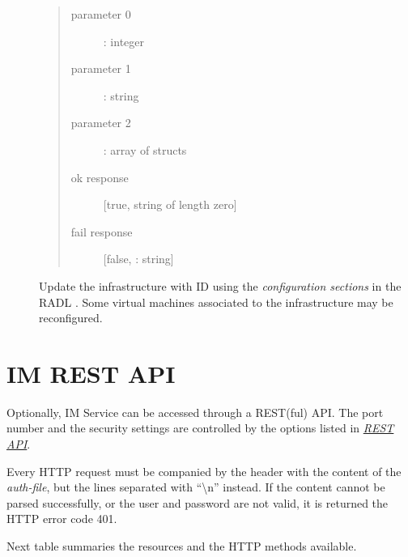 \documentclass[letterpaper,10pt,english]{sphinxmanual}
\begin{document}
\label{xmlrpc:reconfigure-xmlrpc}\begin{description}
\item[{}] \leavevmode\begin{quote}\begin{description}
\item[{parameter 0}] \leavevmode
{}: integer

\item[{parameter 1}] \leavevmode
{}: string

\item[{parameter 2}] \leavevmode
{}: array of structs

\item[{ok response}] \leavevmode
{[}true, string of length zero{]}

\item[{fail response}] \leavevmode
{[}false, : string{]}

\end{description}\end{quote}

Update the infrastructure with ID  using the \emph{configuration
sections} in the RADL . Some virtual machines associated to the
infrastructure may be reconfigured.

\end{description}


\chapter{IM REST API}
\label{REST::doc}\label{REST:im-rest-api}
Optionally, IM Service can be accessed through a REST(ful) API. The port number
and the security settings are controlled by the options listed in
{\hyperref[manual:options-rest]{\emph{REST API}}}.

Every HTTP request must be companied by the header  with
the content of the \emph{auth-file}, but the lines separated with
``\textbackslash{}n'' instead. If the content cannot be parsed successfully, or the user and
password are not valid, it is returned the HTTP error code 401.

Next table summaries the resources and the HTTP methods available.
\end{document}

